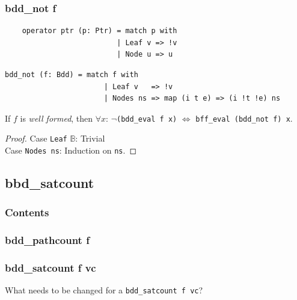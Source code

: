 \documentclass[english, aspectratio=169]{beamer}
\newcommand{\B}[0]{\ensuremath{\mathbb{B}}}
\begin{document}
\begin{frame}[fragile]
  \frametitle{bdd\_not f}

  \begin{lstlisting}
    operator ptr (p: Ptr) = match p with
                          | Leaf v => !v
                          | Node u => u
  \end{lstlisting}
  \begin{lstlisting}[firstnumber=4]
    bdd_not (f: Bdd) = match f with
                       | Leaf v   => !v
                       | Nodes ns => map (i t e) => (i !t !e) ns
  \end{lstlisting}

  \pause

  \begin{theorem}
    If $f$ is \emph{well formed}, then $\forall x$: $\neg$\texttt{(bdd\_eval f x)} $\iff$
    \texttt{bff\_eval (bdd\_not f) x}.
  \end{theorem}
  \begin{proof}
    Case \texttt{Leaf} $\B$: Trivial\\
    Case \texttt{Nodes ns}: Induction on \texttt{ns}.
  \end{proof}
\end{frame}

\subsection{bbd\_satcount}

\begin{frame}{}
  \frametitle{Contents}
\end{frame}

\begin{frame}
  \frametitle{bdd\_pathcount f}

  
\end{frame}

\begin{frame}{}
  \frametitle{bdd\_satcount f vc}

  \begin{center}
    \Huge

    What needs to be changed for a \texttt{bdd\_satcount f vc}?
  \end{center}
\end{frame}
\end{document}
